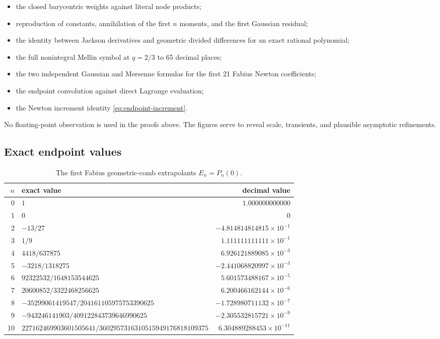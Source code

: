 \documentclass[11pt,a4paper,oneside]{article}
\theoremstyle{definition}
\theoremstyle{remark}
\begin{document}
\begin{itemize}
\item the closed barycentric weights against literal node products;
\item reproduction of constants, annihilation of the first $n$ moments, and
      the first Gaussian residual;
\item the identity between Jackson derivatives and geometric divided
      differences for an exact rational polynomial;
\item the full nonintegral Mellin symbol at $q=2/3$ to 65 decimal places;
\item the two independent Gaussian and Mersenne formulas for the first 21
      Fabius Newton coefficients;
\item the endpoint convolution against direct Lagrange evaluation;
\item the Newton increment identity \eqref{eq:endpoint-increment}.
\end{itemize}

No floating-point observation is used in the proofs above.  The figures serve
to reveal scale, transients, and plausible asymptotic refinements.

\subsection{Exact endpoint values}

\begin{table}[H]
\centering
\caption{The first Fabius geometric-comb extrapolants $E_n=P_n(0)$.}
\label{tab:endpoint-values}
\begin{tabular}{r l r}
\toprule
$n$ & exact value & decimal value\\
\midrule
0 & $1$ & $1.000000000000$\\
1 & $0$ & $0$\\
2 & $-13/27$ & $-4.814814814815\times10^{-1}$\\
3 & $1/9$ & $1.111111111111\times10^{-1}$\\
4 & $4418/637875$ & $6.926121889085\times10^{-3}$\\
5 & $-3218/1318275$ & $-2.441068820997\times10^{-3}$\\
6 & $92322532/1648153544625$ & $5.601573488167\times10^{-5}$\\
7 & $20600852/3322468256625$ & $6.200466162144\times10^{-6}$\\
8 & $-35299061419547/204161105975753390625$ & $-1.728980711132\times10^{-7}$\\
9 & $-943246141903/409122843739646990625$ & $-2.305532815721\times10^{-9}$\\
10 & $227162469903601505641/3602957316310515949176818109375$
& $6.304889288453\times10^{-11}$\\
\bottomrule
\end{tabular}
\end{table}
\end{document}
